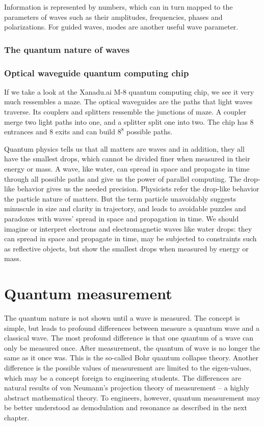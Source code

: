 \documentclass{book}
\begin{document}
Information is represented by numbers, which can in turn mapped to the parameters of waves such as their amplitudes, frequencies, phases and polarizations. For guided waves, modes are another useful wave parameter.

\subsubsection{The quantum nature of waves}

\subsubsection{Optical waveguide quantum computing chip}
If we take a look at the Xanadu.ai M-8 quantum computing chip, we see it very much ressembles a maze. The optical waveguides are the paths that light waves traverse. Its couplers and splitters ressemble the junctions of maze. A coupler merge two light paths into one, and a splitter split one into two. The chip has 8 entrances and 8 exits and can build $8^8$ possible paths.

Quantum physics tells us that all matters are waves and in addition, they all have the smallest drops, which cannot be divided finer when measured in their energy or mass. A wave, like water, can spread in space and propagate in time through all possible paths and give us the power of parallel computing. The drop-like behavior gives us the needed precision. Physicists refer the drop-like behavior the particle nature of matters. But the term particle unavoidably suggests minuscule in size and clarity in trajectory, and leads to avoidable puzzles and paradoxes with waves' spread in space and propagation in time. We should imagine or interpret electrons and electromagnetic waves like water drops: they can spread in space and propagate in time, may be subjected to constraints such as reflective objects, but show the smallest drops when measured by energy or mass.

\section{Quantum measurement}
The quantum nature is not shown until a wave is measured. The concept is simple, but leads to profound differences between measure a quantum wave and a classical wave. The most profound difference is that one quantum of a wave can only be measured once. After measurement, the quantum of wave is no longer the same as it once was. This is the so-called Bohr quantum collapse theory. Another difference is the possible values of measurement are limited to the eigen-values, which may be a concept foreign to engineering students. The differences are natural results of von Neumann's projection theory of measurement -- a highly abstract mathematical theory. To engineers, however, quantum measurement may be better understood as demodulation and resonance as described in the next chapter. 
\end{document}
